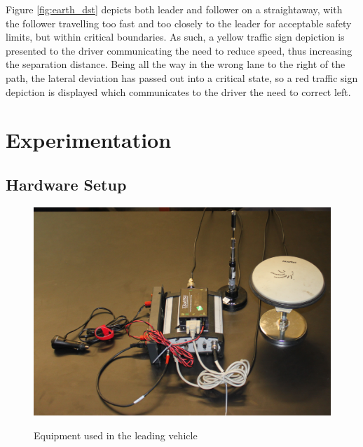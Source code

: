 \documentclass[12pt]{report}
\begin{document}
Figure \ref{fig:earth_dst} depicts both leader and follower on a straightaway, with the follower travelling too fast and too closely to the leader for acceptable safety limits, but within critical boundaries. As such, a yellow traffic sign depiction is presented to the driver communicating the need to reduce speed, thus increasing the separation distance. Being all the way in the wrong lane to the right of the path, the lateral deviation has passed out into a critical state, so a red traffic sign depiction is displayed which communicates to the driver the need to correct left.


\chapter{Experimentation}
\label{chap:exper}

\section{Hardware Setup} \label{sec:hardware}

\begin{figure}[ht] \centering \label{fig:hardwarelead}
    \includegraphics[width=5in]{./figs/lead_hardware.jpg}
    \caption{Equipment used in the leading vehicle}
\end{figure}
\end{document}
